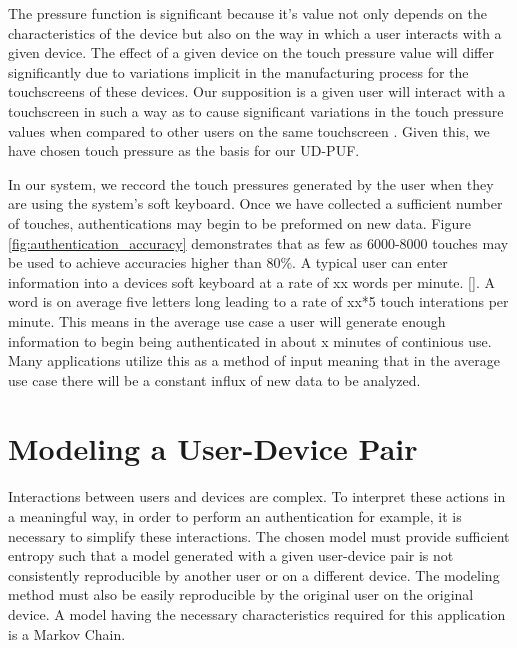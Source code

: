 \documentclass{acm_proc_article-sp}
\begin{document}
The pressure function is significant because it's value not only depends on the characteristics of the device but also on the way in which a user interacts with a given device. The effect of a given device on the touch pressure value will differ significantly due to variations implicit in the manufacturing process for the touchscreens of these devices. \cite{manufacturing_differences} Our supposition is a given user will interact with a touchscreen in such a way as to cause significant variations in the touch pressure values when compared to other users on the same touchscreen \cite{user_touchscreen_interations}.  Given this, we have chosen touch pressure as the basis for our UD-PUF.

In our system, we reccord the touch pressures generated by the user when they are using the system's soft keyboard. Once we have collected a sufficient number of touches, authentications may begin to be preformed on new data. Figure \ref{fig:authentication_accuracy} demonstrates that as few as 6000-8000 touches may be used to achieve accuracies higher than 80\%.
A typical user can enter information into a devices soft keyboard at a rate of xx words per minute. \ref{}. %
A word is on average five letters long leading to a rate of xx*5 touch interations per minute.
This means in the average use case a user will generate enough information to begin being authenticated in about x minutes of continious use.
Many applications utilize this as a method of input meaning that in the average use case there will be a constant influx of new data to be analyzed.

\section{Modeling a User-Device Pair}
\label{sec:modeling}
Interactions between users and devices are complex. To interpret these actions in a meaningful way, in order to perform an authentication for example, it is necessary to simplify these interactions. The chosen model must provide sufficient entropy such that a model generated with a given user-device pair is not consistently reproducible by another user or on a different device. The modeling method must also be easily reproducible by the original user on the original device. A model having the necessary characteristics required for this application is a Markov Chain.
\end{document}
